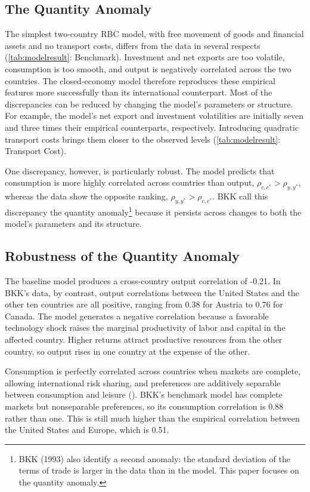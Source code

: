 \subsection{The Quantity Anomaly}

The simplest two-country RBC model, with free movement of goods and financial assets and no transport costs, differs from the data in several respects (\cref{tab:modelresult}: Benchmark). Investment and net exports are too volatile, consumption is too smooth, and output is negatively correlated across the two countries. The closed-economy model therefore reproduces these empirical features more successfully than its international counterpart. Most of the discrepancies can be reduced by changing the model's parameters or structure. For example, the model's net export and investment volatilities are initially seven and three times their empirical counterparts, respectively. Introducing quadratic transport costs brings them closer to the observed levels (\cref{tab:modelresult}: Transport Cost).

One discrepancy, however, is particularly robust. The model predicts that consumption is more highly correlated across countries than output, $\rho_{c,c^*} > \rho_{y,y^*}$, whereas the data show the opposite ranking, $\rho_{y,y^*} > \rho_{c,c^*}$. BKK call this discrepancy the quantity anomaly\footnote{BKK (1993) also identify a second anomaly: the standard deviation of the terms of trade is larger in the data than in the model. This paper focuses on the quantity anomaly.} because it persists across changes to both the model's parameters and its structure.

\subsection{Robustness of the Quantity Anomaly}

The baseline model produces a cross-country output correlation of -0.21. In BKK's data, by contrast, output correlations between the United States and the other ten countries are all positive, ranging from 0.38 for Austria to 0.76 for Canada. The model generates a negative correlation because a favorable technology shock raises the marginal productivity of labor and capital in the affected country. Higher returns attract productive resources from the other country, so output rises in one country at the expense of the other.

Consumption is perfectly correlated across countries when markets are complete, allowing international risk sharing, and preferences are additively separable between consumption and leisure (\cite{Scheinkman:1984aa}). BKK's benchmark model has complete markets but nonseparable preferences, so its consumption correlation is 0.88 rather than one. This is still much higher than the empirical correlation between the United States and Europe, which is 0.51.

